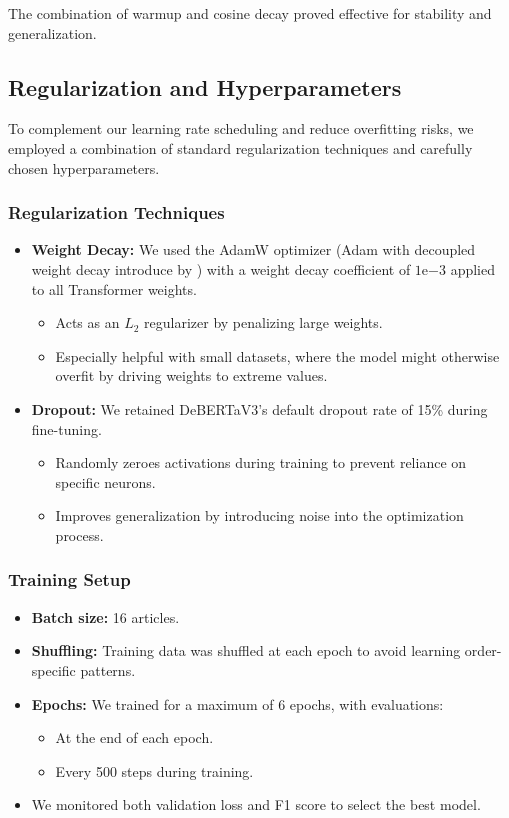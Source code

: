 The combination of warmup and cosine decay proved effective for stability and generalization.

\subsection{Regularization and Hyperparameters}

To complement our learning rate scheduling and reduce overfitting risks, we employed a combination of standard regularization techniques and carefully chosen hyperparameters.

\subsubsection*{Regularization Techniques}
\begin{itemize}[leftmargin=1.5em]
    \item \textbf{Weight Decay:} We used the AdamW optimizer (Adam with decoupled weight decay introduce by \cite{loshchilov2017fixing}) with a weight decay coefficient of $1\text{e}{-3}$ applied to all Transformer weights.
    \begin{itemize}
        \item Acts as an $L_2$ regularizer by penalizing large weights.
        \item Especially helpful with small datasets, where the model might otherwise overfit by driving weights to extreme values.
    \end{itemize}
    
    \item \textbf{Dropout:} We retained \ac{DeBERTaV3}'s default dropout rate of 15\% during fine-tuning.
    \begin{itemize}
        \item Randomly zeroes activations during training to prevent reliance on specific neurons.
        \item Improves generalization by introducing noise into the optimization process.
    \end{itemize}
\end{itemize}


\subsubsection*{Training Setup}
\begin{itemize}[leftmargin=1.5em]
    \item \textbf{Batch size:} 16 articles.
    \item \textbf{Shuffling:} Training data was shuffled at each epoch to avoid learning order-specific patterns.
    \item \textbf{Epochs:} We trained for a maximum of 6 epochs, with evaluations:
    \begin{itemize}
        \item At the end of each epoch.
        \item Every 500 steps during training.
    \end{itemize}
    \item We monitored both validation loss and F1 score to select the best model.
\end{itemize}

